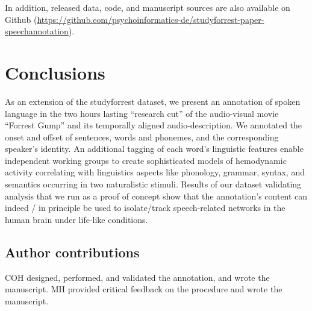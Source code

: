 \documentclass[10pt,a4paper,onecolumn]{article}
\begin{document}
In addition, released data, code, and manuscript sources are also available on
Github (\url{https://github.com/psychoinformatics-de/studyforrest-paper-speechannotation}).


\section*{Conclusions}
As an extension of the studyforrest dataset, we present an annotation of spoken
language in the two hours lasting ``research cut'' of the audio-visual movie
``Forrest Gump'' and its temporally aligned audio-description.
We annotated the onset and offset of sentences, words and phonemes, and the
corresponding speaker's identity.
An additional tagging of each word's linguistic features enable independent
working groups to create sophisticated models of hemodynamic activity
correlating with linguistics aspects like phonology, grammar, syntax, and
semantics occurring in two naturalistic stimuli.
Results of our dataset validating analysis that we run as a proof of concept
show that the annotation's content can indeed / in principle be used to
isolate/track speech-related networks in the human brain under life-like
conditions.


\subsection*{Author contributions}
COH designed, performed, and validated the annotation, and wrote the manuscript.
MH provided critical feedback on the procedure and wrote the manuscript.
\end{document}
